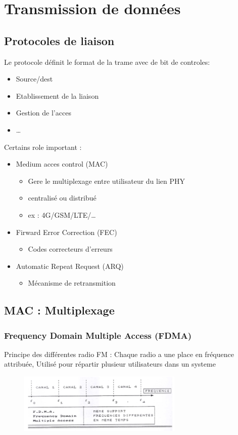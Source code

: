 \section{Transmission de données}
\label{TDD}
	\subsection{Protocoles de liaison}
		Le protocole définit le format de la trame avec de bit de controles:
		\begin{itemize}
			\item Source/dest
			\item Etablissement de la liaison
			\item Gestion de l'acces
			\item \dots
		\end{itemize}
		
		Certains role important :
		\begin{itemize}
			\item Medium acces control (MAC)
			\begin{itemize}
				\item Gere le multiplexage entre utilisateur du lien PHY
				\item centralisé ou distribué
				\item ex : 4G/GSM/LTE/\dots
			\end{itemize}
			\item Firward Error Correction (FEC)
			\begin{itemize}
				\item Codes correcteurs d'erreurs
			\end{itemize}
			\item Automatic Repeat Request  (ARQ)
			\begin{itemize}
				\item Mécanisme de retransmition 
			\end{itemize}
		\end{itemize}
		
	\subsection{MAC : Multiplexage}
		\subsubsection{Frequency Domain Multiple Access (FDMA)}

			Principe des différentes radio FM : Chaque radio a une place en fréquence attribuée, Utilisé pour répartir plusieur utilisateurs dans un systeme
			\begin{figure}[htp]
				\centering
				\includegraphics[width=0.7\textwidth]{img/FDMA.png}
			\end{figure}
		
